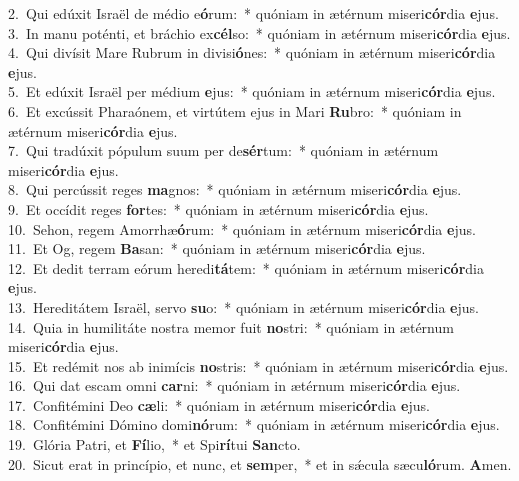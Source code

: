 {2.~}Qui edúxit Israël de médio e\textbf{ó}rum:~* quóniam in ætérnum miseri\textbf{cór}dia \textbf{e}jus.\\
{3.~}In manu poténti, et bráchio ex\textbf{cél}so:~* quóniam in ætérnum miseri\textbf{cór}dia \textbf{e}jus.\\
{4.~}Qui divísit Mare Rubrum in divisi\textbf{ó}nes:~* quóniam in ætérnum miseri\textbf{cór}dia \textbf{e}jus.\\
{5.~}Et edúxit Israël per médium \textbf{e}jus:~* quóniam in ætérnum miseri\textbf{cór}dia \textbf{e}jus.\\
{6.~}Et excússit Pharaónem, et virtútem ejus in Mari \textbf{Ru}bro:~* quóniam in ætérnum miseri\textbf{cór}dia \textbf{e}jus.\\
{7.~}Qui tradúxit pópulum suum per de\textbf{sér}tum:~* quóniam in ætérnum miseri\textbf{cór}dia \textbf{e}jus.\\
{8.~}Qui percússit reges \textbf{ma}gnos:~* quóniam in ætérnum miseri\textbf{cór}dia \textbf{e}jus.\\
{9.~}Et occídit reges \textbf{for}tes:~* quóniam in ætérnum miseri\textbf{cór}dia \textbf{e}jus.\\
{10.~}Sehon, regem Amorrhæ\textbf{ó}rum:~* quóniam in ætérnum miseri\textbf{cór}dia \textbf{e}jus.\\
{11.~}Et Og, regem \textbf{Ba}san:~* quóniam in ætérnum miseri\textbf{cór}dia \textbf{e}jus.\\
{12.~}Et dedit terram eórum heredi\textbf{tá}tem:~* quóniam in ætérnum miseri\textbf{cór}dia \textbf{e}jus.\\
{13.~}Hereditátem Israël, servo \textbf{su}o:~* quóniam in ætérnum miseri\textbf{cór}dia \textbf{e}jus.\\
{14.~}Quia in humilitáte nostra memor fuit \textbf{no}stri:~* quóniam in ætérnum miseri\textbf{cór}dia \textbf{e}jus.\\
{15.~}Et redémit nos ab inimícis \textbf{no}stris:~* quóniam in ætérnum miseri\textbf{cór}dia \textbf{e}jus.\\
{16.~}Qui dat escam omni \textbf{car}ni:~* quóniam in ætérnum miseri\textbf{cór}dia \textbf{e}jus.\\
{17.~}Confitémini Deo \textbf{cæ}li:~* quóniam in ætérnum miseri\textbf{cór}dia \textbf{e}jus.\\
{18.~}Confitémini Dómino domi\textbf{nó}rum:~* quóniam in ætérnum miseri\textbf{cór}dia \textbf{e}jus.\\
{19.~}Glória Patri, et \textbf{Fí}lio,~* et Spi\textbf{rí}tui \textbf{San}cto.\\
{20.~}Sicut erat in princípio, et nunc, et \textbf{sem}per,~* et in sǽcula sæcu\textbf{ló}rum. \textbf{A}men.\\
